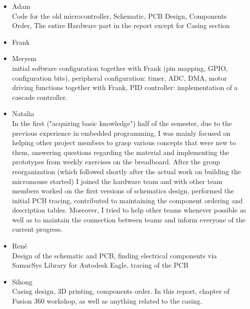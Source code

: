 \documentclass[12pt]{article}
\begin{document}
\begin{itemize}
    \item Adam\\
        Code for the old microcontroller, Schematic, PCB Design, Components Order, The entire Hardware part in the report except for Casing section
    \item Frank\\
    \item Meryem\\
        initial software configuration together with Frank (pin mapping, GPIO, configuration bits), peripheral configuration: timer, ADC, DMA, motor driving functions together with Frank, PID controller: implementation of a cascade controller.
    \item Natalia\\
        In the first ("acquiring basic knowledge") half of the semester, due to the previous experience in embedded programming, I was mainly focused on helping other project members to grasp various concepts that were new to them, answering questions regarding the material and implementing the prototypes from weekly exercises on the breadboard.
        After the group reorganization (which followed shortly after the actual work on building the micromouse started) I joined the hardware team and with other team members worked on the first versions of schematics design, performed the initial PCB tracing, contributed to maintaining the component ordering and description tables.
        Moreover, I tried to help other teams whenever possible as well as to maintain the connection between teams and inform everyone of the current progress.
    \item René\\
         Design of the schematic and PCB, finding electrical components via SamacSys Library for Autodesk Eagle, tracing of the PCB
    \item Sihong\\
        Casing design, 3D printing, components order. In this report, chapter of Fusion 360 workshop, as well as anything related to the casing.
\end{itemize}


\newpage

\tableofcontents
\end{document}
